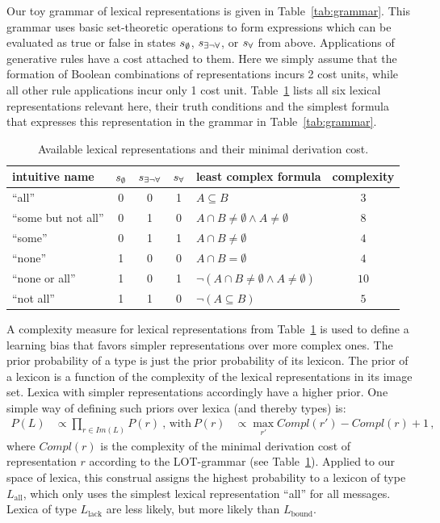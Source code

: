 \documentclass[a4paper, 11pt]{article}
\theoremstyle{Satz}
\newcommand{\state}{\ensuremath{s}\xspace}		%
\newcommand{\mystate}[1]{\ensuremath{\state_{\text{#1}}}\xspace} %
\newcommand{\mylang}[1]{\ensuremath{L_{\text{#1}}}\xspace} %
\newcommand{\ssome}{\mystate{\ensuremath{\exists\neg\forall}}}
\newcommand{\sall}{\mystate{\ensuremath{\forall}}}
\newcommand{\snone}{\mystate{\ensuremath{\emptyset}}}
\newcommand{\Lall}{\mylang{all}}
\newcommand{\Lbound}{\mylang{bound}}
\newcommand{\Llack}{\mylang{lack}}
\begin{document}
Our toy grammar of lexical representations is given in Table~\ref{tab:grammar}. This grammar uses basic
set-theoretic operations to form expressions which can be evaluated as true or false in states
$\snone$, $\ssome$, or $\sall$ from above. Applications of generative rules have a cost attached
to them. Here we simply assume that the formation of Boolean combinations of representations incurs 2
cost units, while all other rule applications incur only 1 cost unit. Table~\ref{tab:concepts}
lists all six lexical representations relevant here, their truth conditions and the simplest formula that
expresses this representation in the grammar in Table~\ref{tab:grammar}.

\begin{table}
  \centering
\begin{center}
  \begin{tabular}{lccclc}
    \toprule
    intuitive name
    & \snone
    & \ssome
    & \sall
    & least complex formula
    & complexity
    \\ \midrule
    ``all''
    & 0
    & 0
    & 1
    & $A \subseteq B$
    & $3$
    \\
    ``some but not all''
    & 0
    & 1
    & 0
    & $A \cap B \neq \emptyset \wedge A \neq \emptyset$
    & $8$
    \\    
    ``some''
    & 0
    & 1
    & 1
    & $A \cap B \neq \emptyset$
    & $4$
    \\
    ``none''
    & 1
    & 0
    & 0
    & $A \cap B = \emptyset$
    & $4$
    \\
    ``none or all''
    & 1
    & 0
    & 1
    & $\neg(A \cap B \neq \emptyset \wedge A \neq \emptyset)$
    & $10$
    \\
    ``not all''
    & 1
    & 1
    & 0
    & $\neg (A \subseteq B)$
    & $5$
    \\
    \bottomrule
  \end{tabular}
\end{center}
\caption{Available lexical representations and their minimal derivation cost.}
\label{tab:concepts}
\end{table}

A complexity measure for lexical representations from Table~\ref{tab:concepts} is used to define a
learning bias that favors simpler representations over more complex ones. The prior probability of a
type is just the prior probability of its lexicon. The prior of a lexicon is a function of the
complexity of the lexical representations in its image set. Lexica with simpler representations accordingly have a
higher prior. One simple way of defining such priors over lexica (and thereby types) is:
\begin{align*}
  P(L)  & \propto \prod_{r \in Im(L)} P(r)   \ \text{, with} & 
  P(r) & \propto \max_{r'}Compl(r') - Compl(r) + 1\,,
\end{align*}
where $Compl(r)$ is the complexity of the minimal derivation cost of representation $r$ according to the
LOT-grammar (see Table~\ref{tab:concepts}). Applied to our space of lexica, this construal assigns the highest probability 
to a lexicon of type $\Lall$, which only uses the simplest lexical representation ``all'' for
all messages. Lexica of type $\Llack$ are less likely, but more likely than $\Lbound$. 
\end{document}
